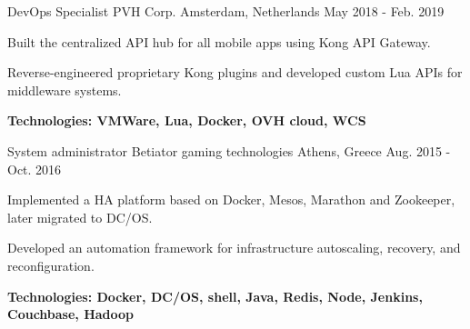 \begin{cventries}
\cventry
{DevOps Specialist}
{PVH Corp.}
{Amsterdam, Netherlands}
{May 2018 - Feb. 2019}
{
	\begin{cvitems}
	\item {Built the centralized API hub for all mobile apps using Kong API Gateway.}
	\item {Reverse-engineered proprietary Kong plugins and developed custom Lua APIs for middleware systems.}
	\item {\bfseries{Technologies:} VMWare, Lua, Docker, OVH cloud, WCS}
	\end{cvitems}
}

\cventry
{System administrator}
{Betiator gaming technologies}
{Athens, Greece}
{Aug. 2015 - Oct. 2016}
{
\begin{cvitems}
\item {Implemented a HA platform based on Docker, Mesos, Marathon and Zookeeper, later migrated to DC/OS.}
\item {Developed an automation framework for infrastructure autoscaling, recovery, and reconfiguration.}
\item {\bfseries{Technologies:} Docker, DC/OS, shell, Java, Redis, Node, Jenkins, Couchbase, Hadoop}
\end{cvitems}
}

\end{cventries}

